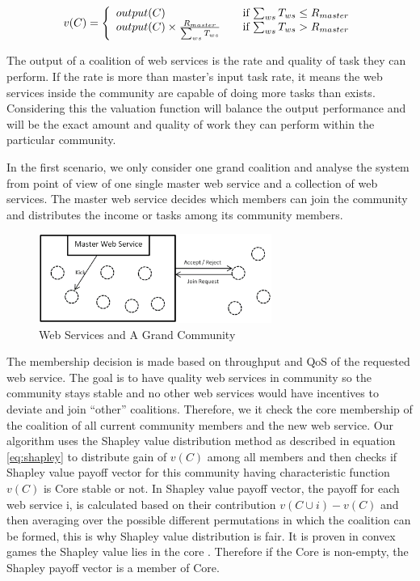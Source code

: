 \documentclass[10pt, conference, compsocconf]{IEEEtran}
\theoremstyle{plain}
\theoremstyle{definition}
\begin{document}
\begin{equation*}
v(C) = \left\{ 
  \begin{array}{l l}
    output(C) & \quad \text{if $\sum_{ws}{T_{ws}} \leq R_{master}$}\\
    output(C) \times \frac{R_{master}}{\sum_{ws}{T_{ws}}} & \quad \text{if $\sum_{ws}{T_{ws}} > R_{master}$}
  \end{array} \right.
\end{equation*}  

The output of a coalition of web services is the rate and quality of task they can perform. If the rate is more than master's input task rate, it means the web services inside the community are capable of doing more tasks than exists. Considering this the valuation function will balance the output performance and will be the exact amount and quality of work they can perform within the particular community. %

In the first scenario, we only consider one grand coalition and analyse the system from point of view of one single master web service and a collection of web services. The master web service decides which members can join %
the community and distributes the income or tasks among its community members.

\begin{figure}[!t]
\centering
\includegraphics[width=3in]{s1.eps}
\caption{Web Services and A Grand Community}
\label{fig_sim}
\end{figure}

The membership decision is made based on throughput and QoS of the requested web service. The goal is to have quality web services in community so the community stays stable and no other web services would have incentives to deviate and join ``other'' coalitions. Therefore, we it check the core membership of the coalition of all current community members and the new web service. Our algorithm uses the Shapley value distribution method as described in equation \ref{eq:shapley} to distribute gain of $v(C)$ among all members and then checks if Shapley value payoff vector for this community having characteristic function $v(C)$ is Core stable or not. In Shapley value payoff vector, the payoff for each web service i, is calculated based on their contribution $v(C \cup {i}) - v(C)$ and then averaging over the possible different permutations in which the coalition can be formed, this is why Shapley value distribution is fair. It is proven in convex games the Shapley value lies in the core \cite{DBLP:conf/ijcai/GrecoMPS11, myerson1991game}. Therefore if the Core is non-empty, the Shapley payoff vector is a member of Core.
\end{document}
